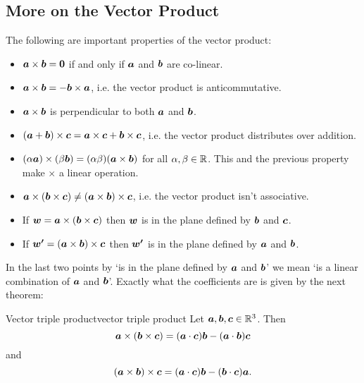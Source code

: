 \documentclass[a4paper]{article}
\begin{document}
    \subsection{More on the Vector Product}
    The following are important properties of the vector product:
    \begin{itemize}
        \item \(\bm{a} \times \bm{b} = \bm{0}\) if and only if \(\bm{a}\) and \(\bm{b}\) are co-linear.
        \item \(\bm{a} \times \bm{b} = -\bm{b} \times \bm{a}\), i.e. the vector product is anticommutative.
        \item \(\bm{a} \times \bm{b}\) is perpendicular to both \(\bm{a}\) and \(\bm{b}\).
        \item \((\bm{a} + \bm{b})\times \bm{c} = \bm{a}\times\bm{c} + \bm{b}\times\bm{c}\), i.e. the vector product distributes over addition.
        \item \((\alpha\bm{a})\times(\beta\bm{b}) = (\alpha\beta)(\bm{a}\times\bm{b})\) for all \(\alpha, \beta\in\mathbb{R}\).
        This and the previous property make \(\times\) a linear operation.
        \item \(\bm{a}\times(\bm{b}\times\bm{c}) \ne (\bm{a}\times\bm{b})\times\bm{c}\), i.e. the vector product isn't associative.
        \item If \(\bm{w} = \bm{a} \times (\bm{b} \times \bm{c})\) then \(\bm{w}\) is in the plane defined by \(\bm{b}\) and \(\bm{c}\).
        \item If \(\bm{w'} = (\bm{a}\times\bm{b}) \times \bm{c}\) then \(\bm{w'}\) is in the plane defined by \(\bm{a}\) and \(\bm{b}\).
    \end{itemize}
    In the last two points by `is in the plane defined by \(\bm{a}\) and \(\bm{b}\)' we mean `is a linear combination of \(\bm{a}\) and \(\bm{b}\)'.
    Exactly what the coefficients are is given by the next theorem:
    \begin{theorem}{Vector triple product}{vector triple product}
        Let \(\bm{a}, \bm{b}, \bm{c} \in \mathbb{R}^3\).
        Then
        \[\bm{a}\times(\bm{b}\times\bm{c}) = (\bm{a}\cdot\bm{c})\bm{b} - (\bm{a}\cdot\bm{b})\bm{c}\]
        and
        \[(\bm{a}\times\bm{b})\times\bm{c} = (\bm{a}\cdot\bm{c})\bm{b} - (\bm{b}\cdot\bm{c})\bm{a}.\]
    \end{theorem}
\end{document}
